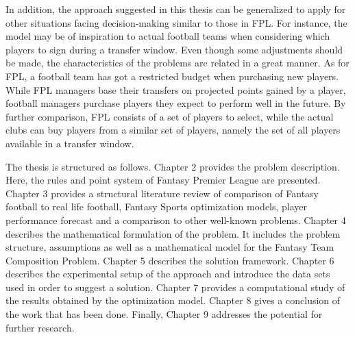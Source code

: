 \newpar

In addition, the approach suggested in this thesis can be generalized to apply for other situations facing decision-making similar to those in FPL. For instance, the model may be of inspiration to actual football teams when considering which players to sign during a transfer window. Even though some adjustments should be made, the characteristics of the problems are related in a great manner. As for FPL, a football team has got a restricted budget when purchasing new players. While FPL managers base their transfers on projected points gained by a player, football managers purchase players they expect to perform well in the future. By further comparison, FPL consists of a set of players to select, while the actual clubs can buy players from a similar set of players, namely the set of all players available in a transfer window.

\newpar

The thesis is structured as follows. Chapter 2 provides the problem description. Here, the rules and point system of Fantasy Premier League are presented. Chapter 3 provides a structural literature review of comparison of Fantasy football to real life football, Fantasy Sports optimization models, player performance forecast and a comparison to other well-known problems. Chapter 4 describes the mathematical formulation of the problem. It includes the problem structure, assumptions as well as a mathematical model for the Fantasy Team Composition Problem. Chapter 5 describes the solution framework. Chapter 6 describes the experimental setup of the approach and introduce the data sets used in order to suggest a solution. Chapter 7 provides a computational study of the results obtained by the optimization model. Chapter 8 gives a conclusion of the work that has been done. Finally, Chapter 9 addresses the potential for further research.



